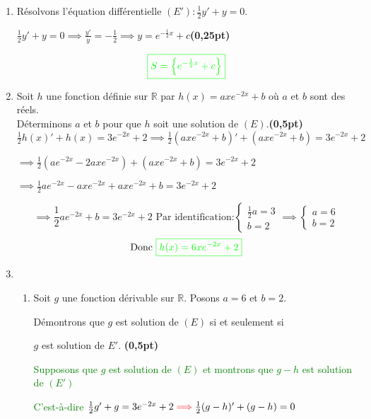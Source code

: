 \documentclass[12pt]{article}
\begin{document}
\renewcommand{\labelenumi}{\theenumi)}
\begin{enumerate}[label=\arabic*)]
    \item Résolvons l'équation différentielle \( (E'):\frac{1}{2}y'+y=0 \).
    
		    \( \frac{1}{2}y'+y=0 \implies \frac{y'}{y}=-\frac{1}{2} \implies y=e^{-\frac{1}{2}x}+c\)\hfill \textbf{(0,25pt)}
    
    	   			\[\textcolor{green}{\boxed{S= \left\lbrace e^{-\frac{1}{2}x}+c \right\rbrace  }}\]
    	   			
    \item Soit $h$ une fonction définie sur $\mathbb{R}$ par $h(x)=axe^{-2x}+b$ où $a$ et $b$ sont  des réels.\\
        Déterminons $a$ et $b$ pour que $h$ soit une solution de $(E).$\hfill \textbf{(0,5pt)}
        \( \frac{1}{2}h(x)'+h(x)=3e^{-2x}+2 \implies \frac{1}{2}(axe^{-2x}+b)'+(axe^{-2x}+b)=3e^{-2x}+2 \)
        
        \( \implies \frac{1}{2}(ae^{-2x}-2axe^{-2x})+(axe^{-2x}+b)=3e^{-2x}+2 \)
        
        \( \implies \frac{1}{2}ae^{-2x}-axe^{-2x}+axe^{-2x}+b=3e^{-2x}+2 \)
        
        \[ 
        \implies \frac{1}{2}ae^{-2x}+b=3e^{-2x}+2\text{ Par identification:}
        \begin{cases}
        \frac{1}{2}a=3\\
        b=2
        \end{cases}\implies
        \begin{cases}
         a=6\\
         b=2
        \end{cases}
        \]
\[\text{Donc } \textcolor{green}{\boxed{h(x)=6xe^{-2x}+2}} \]
    \item
    \begin{enumerate}[label=\alph*)]
       \item Soit $g$ une fonction dérivable sur $\mathbb{R}.$ Posons $a=6$ et $b=2.$
       
        Démontrons que $g$ est solution de $(E)$ si et seulement si
        
         \( g \) est solution  de \( E' \). \hfill \textbf{(0,5pt)}
         
         \textcolor{green}{Supposons que \( g \) est solution de \( (E) \) et montrons que \( g-h \) est solution de \( (E') \) }
         
	   \textcolor{green}{C'est-à-dire  \( \frac{1}{2}g'+g = 3e^{-2x}+2  \textcolor{red}{\implies} \frac{1}{2}(g-h)'+(g-h)=0\)}       
	   

\end{enumerate}
\end{enumerate}
\end{document}
